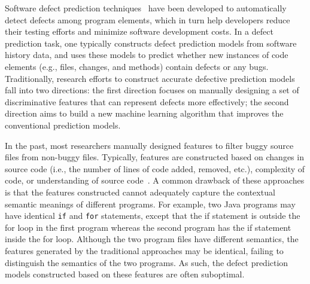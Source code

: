 
Software defect prediction techniques~\cite{hassan2009predicting, jiang2013personalized, zimmermann2007predicting} have been developed to automatically detect defects among program elements, which in turn help developers reduce their testing efforts and minimize
software development costs. In a defect prediction task, one typically constructs
defect prediction models from software history data, and uses these models to predict whether new instances of code elements (e.g., files, changes, and methods) contain defects or any bugs. 
Traditionally, research efforts to construct accurate defective prediction models fall into two directions:
the first direction focuses on manually designing a set of discriminative features that can represent defects more effectively; the second direction aims to build a new machine learning algorithm that improves the conventional prediction models. 

In the past, most researchers manually designed features to filter buggy source files from non-buggy files. Typically, features are constructed based on changes in source code (i.e., the number of lines of code added, removed, etc.), complexity of code, or understanding of source code~\cite{jiang2013personalized, e1994candidate, mccabe1976complexity, chidamber1994metrics, harrison1998evaluation}. 
A common drawback of these approaches is that the features constructed cannot adequately capture the contextual semantic meanings of different programs. For example, two Java programs may have identical \texttt{if} and \texttt{for} statements, except that the if statement is outside the for loop in the first program whereas the second program has the if statement inside the for loop. Although the two program files have different semantics, the features generated by the traditional approaches may be identical, failing to distinguish the semantics of the two programs. As such, the defect prediction models constructed based on these features are often suboptimal.

